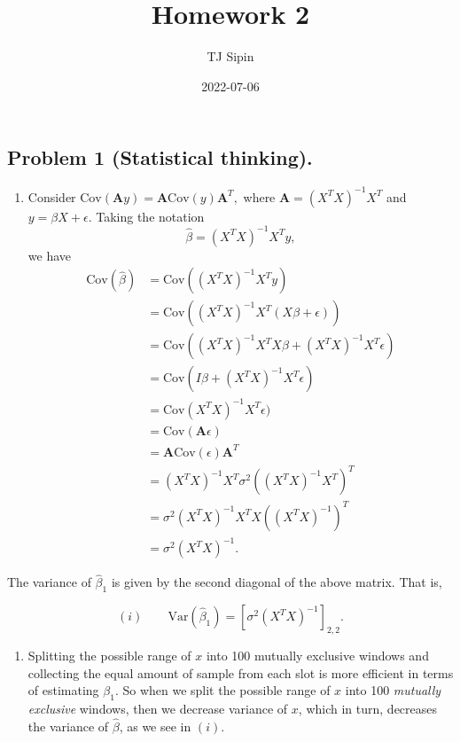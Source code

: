 \documentclass[
]{article}
\title{Homework 2}
\author{TJ Sipin}
\date{2022-07-06}
\providecommand{\tightlist}{%
  \setlength{\itemsep}{0pt}\setlength{\parskip}{0pt}}
\begin{document}
\maketitle

\hypertarget{problem-1-statistical-thinking.}{%
\subsection{Problem 1 (Statistical
thinking).}\label{problem-1-statistical-thinking.}}

\begin{enumerate}
\def\labelenumi{(\alph{enumi})}
\tightlist
\item
  Consider
  \(\text{Cov}(\textbf{A}y) = \textbf{A}\text{Cov}(y)\textbf{A}^T,\)
  where \(\textbf{A} = (X^T X)^{-1} X^T\) and
  \(y = \beta X + \epsilon\). Taking the notation
  \[\hat \beta = (X^T X)^{-1} X^T y ,\] we have \[\begin{align}
  \text{Cov}(\hat \beta ) &= \text{Cov}((X^T X)^{-1} X^T y) \\
  &= \text{Cov}((X^T X)^{-1} X^T (X \beta + \epsilon)) \\
  &= \text{Cov}((X^T X)^{-1} X^T X \beta + (X^T X)^{-1} X^T \epsilon)\\
  &= \text{Cov} (I \beta + (X^T X)^{-1} X^T \epsilon)\\
  &= \text{Cov} (X^T X)^{-1} X^T \epsilon) \\
  &= \text{Cov}(\textbf{A}\epsilon) \\
  &= \textbf{A}\text{Cov}(\epsilon)\textbf{A}^T \\
  &= (X^T X)^{-1} X^T \sigma^2 ((X^T X)^{-1} X^T)^T \\
  &= \sigma^2 (X^T X)^{-1} X^T X \left ((X^T X)^{-1} \right )^T \\
  &= \sigma^2 (X^T X)^{-1}.
  \end{align}\]
\end{enumerate}

The variance of \(\hat\beta_1\) is given by the second diagonal of the
above matrix. That is,

\[
(i) \qquad 
\text{Var}(\hat \beta_1 ) = \left [ \sigma^2 (X^T X)^{-1}\right ]_{2,2}.
\]

\begin{enumerate}
\def\labelenumi{(\alph{enumi})}
\setcounter{enumi}{1}
\tightlist
\item
  Splitting the possible range of \(x\) into 100 mutually exclusive
  windows and collecting the equal amount of sample from each slot is
  more efficient in terms of estimating \(\beta_1\). So when we split
  the possible range of \(x\) into 100 \emph{mutually exclusive}
  windows, then we decrease variance of \(x\), which in turn, decreases
  the variance of \(\hat\beta\), as we see in \((i)\).
\end{enumerate}
\end{document}
